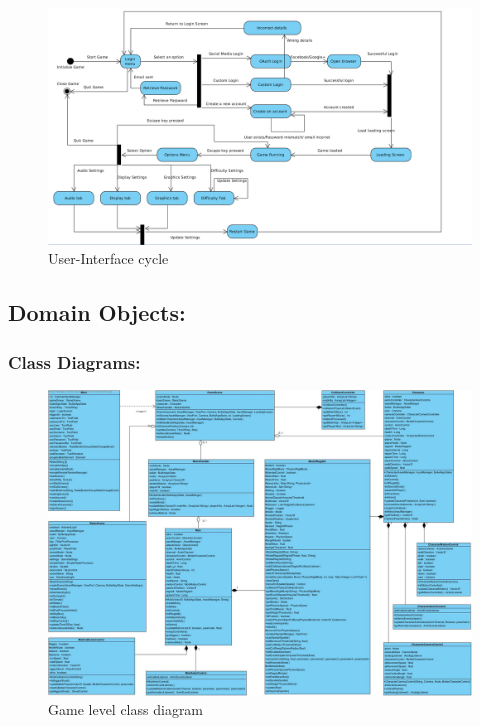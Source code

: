 \documentclass[letterpaper]{article}
\begin{document}
		\begin{figure}[H]
			\centering
			\includegraphics[width=180mm]{UML_Diagram/State/GUI_State.jpg}
			\caption{User-Interface cycle}
			\label{overflow}
			\end{figure}
			
			\vspace{0.2in}
			\subsection*{Domain Objects:}
			\vspace{0.1in}
			
				\vspace{0.2in}
				\subsubsection*{Class Diagrams:}
				\vspace{0.1in}
				
					\begin{figure}[H]
					\centering
					\includegraphics[width=180mm]{UML_Diagram/Class/Game_Classes.jpg}
					\caption{Game level class diagram}
					\label{overflow}
					\end{figure}
					
\end{document}
